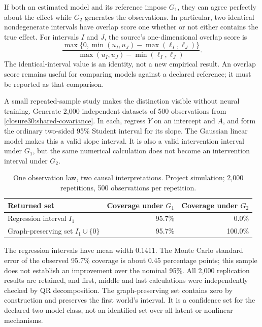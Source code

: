 If both an estimated model and its reference impose $G_1$, they can agree
perfectly about the effect while $G_2$ generates the observations. In
particular, two identical nondegenerate intervals have overlap score one
whether or not either contains the true effect. For intervals $I$ and $J$,
the source's one-dimensional overlap score is
\begin{equation}
 \frac{\max\{0,\min(u_I,u_J)-\max(\ell_I,\ell_J)\}}
 {\max(u_I,u_J)-\min(\ell_I,\ell_J)}.
 \label{closure30:interval-agreement}
\end{equation}
The identical-interval value is an identity, not a new empirical result.
An overlap score remains useful for comparing models against a declared
reference; it must be reported as that comparison.
\citep[p.~61, equations (23)--(24)]{closure30molero}

A small repeated-sample study makes the distinction visible without neural
training. Generate 2,000 independent datasets of 500 observations from
\eqref{closure30:shared-covariance}. In each, regress $Y$ on an intercept and
$A$, and form the ordinary two-sided 95\% Student interval for its slope.
The Gaussian linear model makes this a valid slope interval. It is also a
valid intervention interval under $G_1$, but the same numerical calculation
does not become an intervention interval under $G_2$.

\begin{table}[tbp]
\centering
\caption{One observation law, two causal interpretations. Project simulation;
 2,000 repetitions, 500 observations per repetition.}
\begin{tabular}{lrr}
\toprule
Returned set & Coverage under $G_1$ & Coverage under $G_2$\\
\midrule
Regression interval $I_1$ & 95.7\% & 0.0\%\\
Graph-preserving set $I_1\cup\{0\}$ & 95.7\% & 100.0\%\\
\bottomrule
\end{tabular}
\label{closure30:graph-coverage-table}
\end{table}

The regression intervals have mean width 0.1411. The Monte Carlo standard
error of the observed 95.7\% coverage is about 0.45 percentage points; this
sample does not establish an improvement over the nominal 95\%. All 2,000
replication results are retained, and first, middle and last calculations
were independently checked by QR decomposition. The graph-preserving set
contains zero by construction and preserves the first world's interval.
It is a confidence set for the declared two-model class, not an identified
set over all latent or nonlinear mechanisms.

